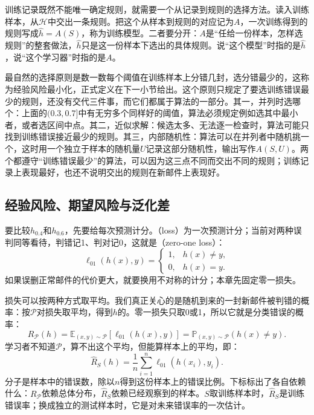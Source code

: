 训练记录既然不能唯一确定规则，就需要一个从记录到规则的选择方法。读入训练样本，从$\mathcal H$中交出一条规则。把这个从样本到规则的对应记为$A$，一次训练得到的规则写成$\hat h=A(S)$，称为训练模型。二者要分开：$A$是“任给一份样本，怎样选规则”的整套做法，$\hat h$只是这一份样本下选出的具体规则。说“这个模型”时指的是$\hat h$，说“这个学习器”时指的是$A$。

最自然的选择原则是数一数每个阈值在训练样本上分错几封，选分错最少的，这称为经验风险最小化，正式定义在下一小节给出。这个原则只规定了要选训练错误最少的规则，还没有交代三件事，而它们都属于算法的一部分。其一，并列时选哪个：上面的$(0.3,0.7]$中有无穷多个同样好的阈值，算法必须规定例如选其中最小者，或者选区间中点。其二，近似求解：候选太多、无法逐一检查时，算法可能只找到训练错误接近最少的规则。其三，内部随机性：算法可以在并列者中随机挑一个，这时用一个独立于样本的随机量$U$记录这部分随机性，输出写作$A(S,U)$。两个都遵守“训练错误最少”的算法，可以因为这三点不同而交出不同的规则；训练记录上表现最好，也还不说明交出的规则在新邮件上表现好。

\subsection{经验风险、期望风险与泛化差}
\label{sec:learning-problem-risk}

要比较$h_{0.4}$和$h_{0.6}$，先要给每次预测计分。（loss）为一次预测计分；当前对两种误判同等看待，判错记1、判对记0，这就是（zero-one loss）：
\begin{equation}
 \ell_{01}(h(x),y)=\begin{cases}
  1,&h(x)\neq y,\\
  0,&h(x)=y.
 \end{cases}
 \label{eq:zero-one-loss}
\end{equation}
如果误删正常邮件的代价更大，就要换用不对称的计分；本章先固定零一损失。

损失可以按两种方式取平均。我们真正关心的是随机到来的一封新邮件被判错的概率：按$\mathcal P$对损失取平均，得到$h$的。零一损失只取0或1，所以它就是分类错误的概率：
\begin{equation}
 R_{\mathcal P}(h)
 =\mathbb E_{(x,y)\sim\mathcal P}[\ell_{01}(h(x),y)]
 =\mathbb P_{(x,y)\sim\mathcal P}(h(x)\neq y).
 \label{eq:population-classification-risk}
\end{equation}
学习者不知道$\mathcal P$，算不出这个平均，但能算样本上的平均，即：
\begin{equation}
 \hat R_S(h)=\frac1n\sum_{i=1}^n\ell_{01}(h(x_i),y_i).
 \label{eq:empirical-classification-risk}
\end{equation}
分子是样本中的错误数，除以$n$得到这份样本上的错误比例。下标标出了各自依赖什么：$R_{\mathcal P}$依赖总体分布，$\hat R_S$依赖已经观察到的样本。$S$取训练样本时，$\hat R_S$是训练错误率；换成独立的测试样本时，它是对未来错误率的一次估计。

